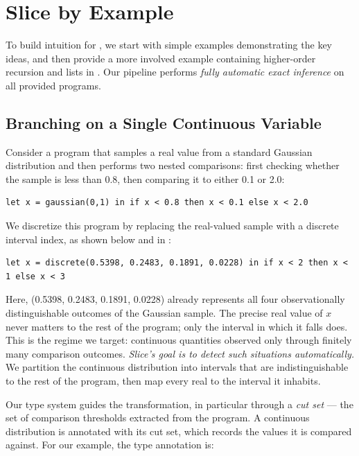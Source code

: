 \section{Slice by Example}\label{sec:examples}
To build intuition for \Slice{}, we start with simple examples demonstrating the key ideas, and then provide a more involved example containing higher-order recursion and lists in . Our pipeline performs \emph{fully automatic exact inference} on all provided programs.

\subsection{Branching on a Single Continuous Variable}\label{sec:examples:1}
Consider a program that samples a real value from a standard Gaussian distribution and then performs two nested comparisons: first checking whether the sample is less than 0.8, then comparing it to either 0.1 or 2.0:

\begin{lstlisting}[aboveskip=1em,belowskip=1em,gobble=4]
    let x = gaussian(0,1) in if x < 0.8 then x < 0.1 else x < 2.0
\end{lstlisting}

\noindent We discretize this program by replacing the real-valued sample with a discrete interval index, as shown below and in :



\begin{lstlisting}[aboveskip=1em,belowskip=1em,gobble=4]
    let x = discrete(0.5398, 0.2483, 0.1891, 0.0228) in if x < 2 then x < 1 else x < 3
\end{lstlisting}

\noindent Here, \discrete(0.5398, 0.2483, 0.1891, 0.0228) already represents all four observationally distinguishable outcomes of the Gaussian sample. The precise real value of $x$ never matters to the rest of the program; only the interval in which it falls does. This is the regime we target: continuous quantities observed only through finitely many comparison outcomes. \emph{Slice’s goal is to detect such situations automatically.} We partition the continuous distribution into intervals that are indistinguishable to the rest of the program, then map every real to the interval it inhabits.

Our type system guides the transformation, in particular through a \emph{cut set} --- the set of comparison thresholds extracted from the program. A continuous distribution is annotated with its cut set, which records the values it is compared against. For our example, the type annotation is:

